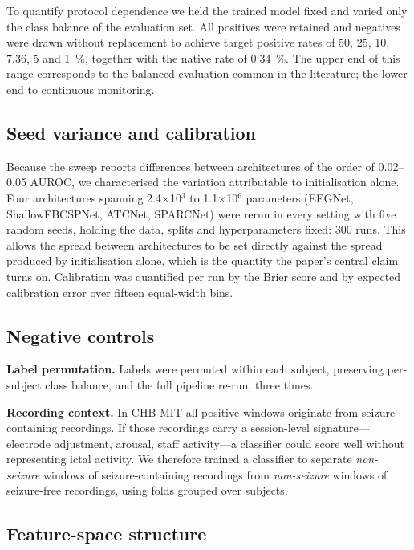 \documentclass[11pt,a4paper]{article}
\begin{document}
To quantify protocol dependence we held the trained model fixed and varied
only the class balance of the evaluation set. All positives were retained and
negatives were drawn without replacement to achieve target positive rates of
50, 25, 10, 7.36, 5 and \SI{1}{\percent}, together with the native rate of
\SI{0.34}{\percent}. The upper end of this range corresponds to the balanced
evaluation common in the literature; the lower end to continuous monitoring.

\subsection{Seed variance and calibration}

Because the sweep reports differences between architectures of the order of
0.02--0.05 AUROC, we characterised the variation attributable to
initialisation alone. Four architectures spanning 2.4$\times$10$^3$ to
1.1$\times$10$^6$ parameters (EEGNet, ShallowFBCSPNet, ATCNet, SPARCNet)
were rerun in every setting with five random seeds, holding the data,
splits and hyperparameters fixed: 300 runs. This allows the spread between
architectures to be set directly against the spread produced by
initialisation alone, which is the quantity the paper's central claim turns
on.
Calibration was quantified per run by the Brier score and by expected
calibration error over fifteen equal-width bins.

\subsection{Negative controls}

\textbf{Label permutation.} Labels were permuted within each subject,
preserving per-subject class balance, and the full pipeline re-run, three
times.

\textbf{Recording context.} In CHB-MIT all positive windows originate from
seizure-containing recordings. If those recordings carry a session-level
signature---electrode adjustment, arousal, staff activity---a classifier could
score well without representing ictal activity. We therefore trained a
classifier to separate \emph{non-seizure} windows of seizure-containing
recordings from \emph{non-seizure} windows of seizure-free recordings, using
folds grouped over subjects.

\subsection{Feature-space structure}
\end{document}
